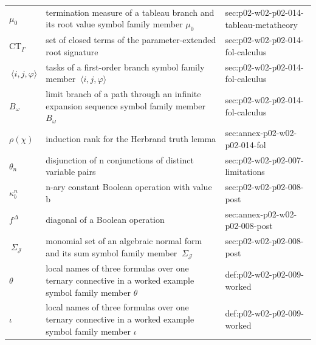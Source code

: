 \begin{longtable}{@{}p{}p{}p{}@{}}
\(\mu_0\) & termination measure of a tableau branch and its root value symbol family member \(\mu_0\) & sec:\allowbreak{}p02-\allowbreak{}w02-\allowbreak{}p02-\allowbreak{}014-\allowbreak{}tableau-\allowbreak{}metatheory \\
\(\mathrm{CT}_{\Gamma}\) & set of closed terms of the parameter-extended root signature & sec:\allowbreak{}p02-\allowbreak{}w02-\allowbreak{}p02-\allowbreak{}014-\allowbreak{}fol-\allowbreak{}calculus \\
\(\ \langle i,\allowbreak j,\allowbreak \varphi\rangle\) & tasks of a first-order branch symbol family member \(\ \langle i,j,\varphi\rangle\) & sec:\allowbreak{}p02-\allowbreak{}w02-\allowbreak{}p02-\allowbreak{}014-\allowbreak{}fol-\allowbreak{}calculus \\
\(B_\omega\) & limit branch of a path through an infinite expansion sequence symbol family member \(B_\omega\) & sec:\allowbreak{}p02-\allowbreak{}w02-\allowbreak{}p02-\allowbreak{}014-\allowbreak{}fol-\allowbreak{}calculus \\
\(\rho(\chi)\) & induction rank for the Herbrand truth lemma & sec:\allowbreak{}annex-\allowbreak{}p02-\allowbreak{}w02-\allowbreak{}p02-\allowbreak{}014-\allowbreak{}fol \\
\(\theta_n\) & disjunction of n conjunctions of distinct variable pairs & sec:\allowbreak{}p02-\allowbreak{}w02-\allowbreak{}p02-\allowbreak{}007-\allowbreak{}limitations \\
\(\kappa^n_b\) & n-ary constant Boolean operation with value b & sec:\allowbreak{}p02-\allowbreak{}w02-\allowbreak{}p02-\allowbreak{}008-\allowbreak{}post \\
\(f^\Delta\) & diagonal of a Boolean operation & sec:\allowbreak{}annex-\allowbreak{}p02-\allowbreak{}w02-\allowbreak{}p02-\allowbreak{}008-\allowbreak{}post \\
\(\ \Sigma_{\mathcal J}\) & monomial set of an algebraic normal form and its sum symbol family member \(\ \Sigma_{\mathcal J}\) & sec:\allowbreak{}p02-\allowbreak{}w02-\allowbreak{}p02-\allowbreak{}008-\allowbreak{}post \\
\(\theta\) & local names of three formulas over one ternary connective in a worked example symbol family member \(\theta\) & def:\allowbreak{}p02-\allowbreak{}w02-\allowbreak{}p02-\allowbreak{}009-\allowbreak{}worked \\
\(\iota\) & local names of three formulas over one ternary connective in a worked example symbol family member \(\iota\) & def:\allowbreak{}p02-\allowbreak{}w02-\allowbreak{}p02-\allowbreak{}009-\allowbreak{}worked \\

\end{longtable}
